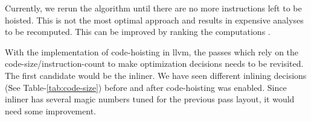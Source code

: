 \documentclass{sig-alternate}
\begin{document}
Currently, we rerun the algorithm until there are no more instructions left to
be hoisted. This is not the most optimal approach and results in expensive
analyses to be recomputed. This can be improved by ranking the computations
\cite{rosen1988global}.

With the implementation of code-hoisting in llvm, the passes which rely on the
code-size/instruction-count to make optimization decisions needs to be
revisited. The first candidate would be the inliner. We have seen different
inlining decisions (See Table-\ref{tab:code-size}) before and after
code-hoisting was enabled.  Since inliner has several magic numbers tuned for
the previous pass layout, it would need some improvement.



{\small

}
\end{document}
